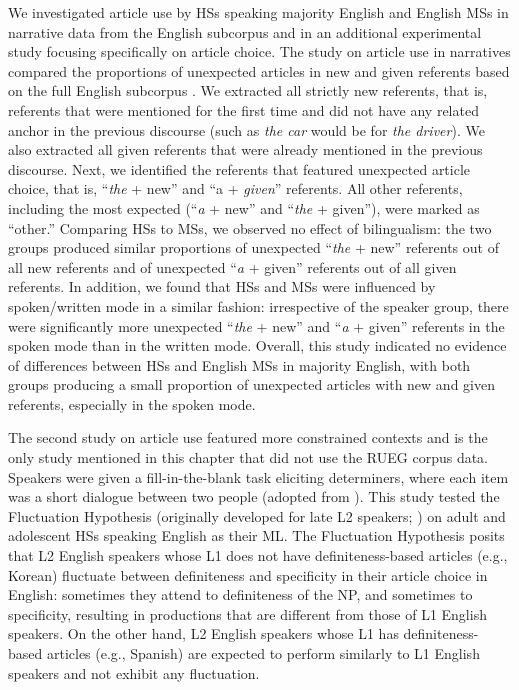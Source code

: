 \documentclass[output=paper,colorlinks,citecolor=brown]{langscibook}
\begin{document}
We investigated article use by HSs speaking majority English and English MSs in narrative data from the English subcorpus and in an additional experimental study focusing specifically on article choice. The study on article use in narratives compared the proportions of unexpected articles in new and given referents based on the full English subcorpus \parencite[10--14]{wiese2022}. We extracted all strictly new referents, that is, referents that were mentioned for the first time and did not have any related anchor in the previous discourse (such as \textit{the car} would be for \textit{the driver}). We also extracted all given referents that were already mentioned in the previous discourse. Next, we identified the referents that featured unexpected article choice, that is, “\textit{the} + new” and “a + \textit{given}” referents. All other referents, including the most expected (“\textit{a} + new” and “\textit{the} + given”), were marked as “other.” Comparing HSs to MSs, we observed no effect of bilingualism: the two groups produced similar proportions of unexpected “\textit{the} + new” referents out of all new referents and of unexpected “\textit{a} + given” referents out of all given referents. In addition, we found that HSs and MSs were influenced by spoken/written mode in a similar fashion: irrespective of the speaker group, there were significantly more unexpected “\textit{the} + new” and “\textit{a} + given” referents in the spoken mode than in the written mode. Overall, this study indicated no evidence of differences between HSs and English MSs in majority English, with both groups producing a small proportion of unexpected articles with new and given referents, especially in the spoken mode.

The second study on article use \parencite{pashkovainprep_b} featured more constrained contexts and is the only study mentioned in this chapter that did not use the RUEG corpus data. Speakers were given a fill-in-the-blank task eliciting determiners, where each item was a short dialogue between two people (adopted from \cite{Ionin2008}). This study tested the Fluctuation Hypothesis (originally developed for late L2 speakers; \cite{Ionin2006}) on adult and adolescent HSs speaking English as their ML. The Fluctuation Hypothesis posits that L2 English speakers whose L1 does not have definiteness-based articles (e.g., Korean) fluctuate between definiteness and specificity in their article choice in English: sometimes they attend to definiteness of the NP, and sometimes to specificity, resulting in productions that are different from those of L1 English speakers. On the other hand, L2 English speakers whose L1 has definiteness-based articles (e.g., Spanish) are expected to perform similarly to L1 English speakers and not exhibit any fluctuation.
\end{document}

